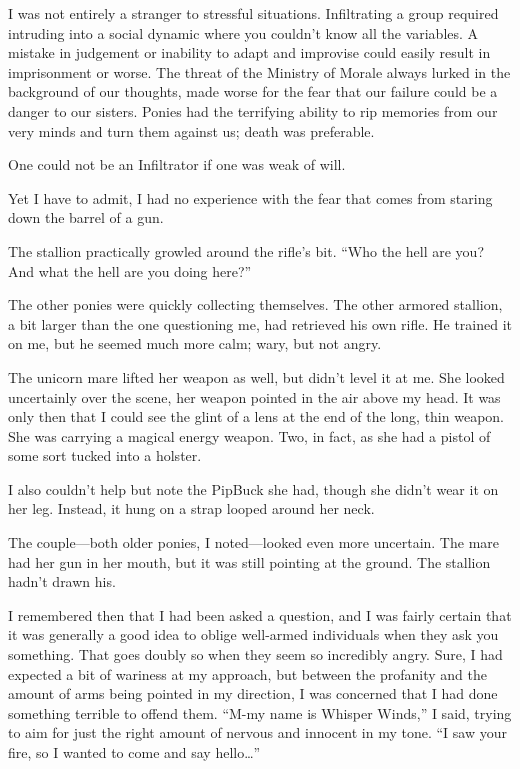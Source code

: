 I was not entirely a stranger to stressful situations. Infiltrating a group required intruding into a social dynamic where you couldn’t know all the variables. A mistake in judgement or inability to adapt and improvise could easily result in imprisonment or worse. The threat of the Ministry of Morale always lurked in the background of our thoughts, made worse for the fear that our failure could be a danger to our sisters. Ponies had the terrifying ability to rip memories from our very minds and turn them against us; death was preferable.

One could not be an Infiltrator if one was weak of will.

Yet I have to admit, I had no experience with the fear that comes from staring down the barrel of a gun.

The stallion practically growled around the rifle’s bit. “Who the hell are you? And what the hell are you doing here?”

The other ponies were quickly collecting themselves. The other armored stallion, a bit larger than the one questioning me, had retrieved his own rifle. He trained it on me, but he seemed much more calm; wary, but not angry.

The unicorn mare lifted her weapon as well, but didn’t level it at me. She looked uncertainly over the scene, her weapon pointed in the air above my head. It was only then that I could see the glint of a lens at the end of the long, thin weapon. She was carrying a magical energy weapon. Two, in fact, as she had a pistol of some sort tucked into a holster.

I also couldn’t help but note the PipBuck she had, though she didn’t wear it on her leg. Instead, it hung on a strap looped around her neck.

The couple—both older ponies, I noted—looked even more uncertain. The mare had her gun in her mouth, but it was still pointing at the ground. The stallion hadn’t drawn his.

I remembered then that I had been asked a question, and I was fairly certain that it was generally a good idea to oblige well-armed individuals when they ask you something. That goes doubly so when they seem so incredibly angry. Sure, I had expected a bit of wariness at my approach, but between the profanity and the amount of arms being pointed in my direction, I was concerned that I had done something terrible to offend them. “M-my name is Whisper Winds,” I said, trying to aim for just the right amount of nervous and innocent in my tone. “I saw your fire, so I wanted to come and say hello…”

